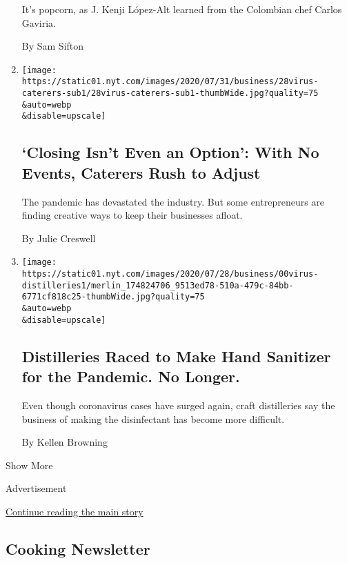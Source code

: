 \begin{enumerate}
  It's popcorn, as J. Kenji López-Alt learned from the Colombian chef
  Carlos Gaviria.

  By Sam Sifton
\item
  \href{/2020/08/04/business/coronavirus-struggling-caterers.html}{}

  \texttt{[image: https://static01.nyt.com/images/2020/07/31/business/28virus-caterers-sub1/28virus-caterers-sub1-thumbWide.jpg?quality=75\\\&auto=webp\\\&disable=upscale]}

  \hypertarget{closing-isnt-even-an-option-with-no-events-caterers-rush-to-adjust}{%
  \subsection{`Closing Isn't Even an Option': With No Events, Caterers
  Rush to
  Adjust}\label{closing-isnt-even-an-option-with-no-events-caterers-rush-to-adjust}}

  The pandemic has devastated the industry. But some entrepreneurs are
  finding creative ways to keep their businesses afloat.

  By Julie Creswell
\item
  \href{/2020/08/04/business/distilleries-hand-sanitizer-pandemic.html}{}

  \texttt{[image: https://static01.nyt.com/images/2020/07/28/business/00virus-distilleries1/merlin\_174824706\_9513ed78-510a-479c-84bb-6771cf818c25-thumbWide.jpg?quality=75\\\&auto=webp\\\&disable=upscale]}

  \hypertarget{distilleries-raced-to-make-hand-sanitizer-for-the-pandemic-no-longer}{%
  \subsection{Distilleries Raced to Make Hand Sanitizer for the
  Pandemic. No
  Longer.}\label{distilleries-raced-to-make-hand-sanitizer-for-the-pandemic-no-longer}}

  Even though coronavirus cases have surged again, craft distilleries
  say the business of making the disinfectant has become more difficult.

  By Kellen Browning
\end{enumerate}

Show More

Advertisement

\protect\hyperlink{after-mid2}{Continue reading the main story}

\hypertarget{cooking-newsletter}{%
\subsection{Cooking Newsletter}\label{cooking-newsletter}}

